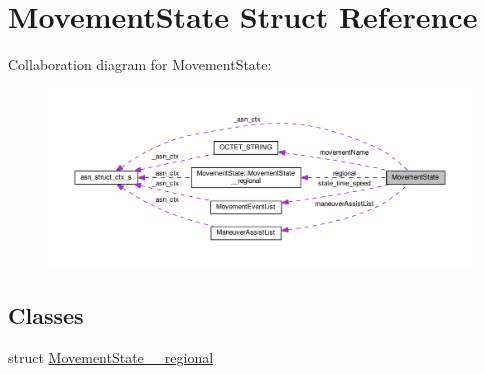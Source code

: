 \hypertarget{structMovementState}{}\section{Movement\+State Struct Reference}
\label{structMovementState}


Collaboration diagram for Movement\+State\+:\nopagebreak
\begin{figure}[H]
\begin{center}
\leavevmode
\includegraphics[width=350pt]{structMovementState__coll__graph}
\end{center}
\end{figure}
\subsection*{Classes}
\begin{DoxyCompactItemize}
\item 
struct \hyperlink{structMovementState_1_1MovementState____regional}{Movement\+State\+\_\+\+\_\+regional}
\end{DoxyCompactItemize}
